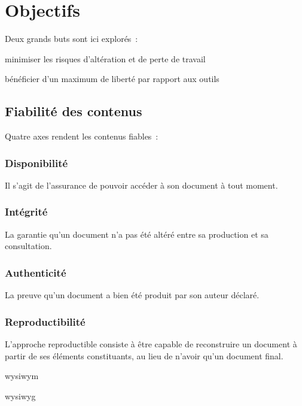 \section{Objectifs}

Deux grands buts sont ici explorés :
\begin{enum}
\item{minimiser les risques d’altération et de perte de travail}
\item{bénéficier d’un maximum de liberté par rapport aux outils}
\end{enum}

\hr

\subsection{Fiabilité des contenus}

Quatre axes rendent les contenus fiables :

\subsubsection{Disponibilité}

Il s’agit de l’assurance de pouvoir accéder à son document à tout moment.

\subsubsection{Intégrité}

La garantie qu’un document n’a pas été altéré
entre sa production et sa consultation.

\subsubsection{Authenticité}

La preuve qu’un document a bien été produit par son auteur déclaré.

\subsubsection{Reproductibilité}

L’approche reproductible consiste à être capable de reconstruire un document
à partir de ses éléments constituants, au lieu de n’avoir qu’un document final.

\begin{itmz}
\item{\gls{wysiwym} \cite{wysiwym}}
\item{\gls{wysiwyg} \cite{wysiwyg}}
\end{itmz}

